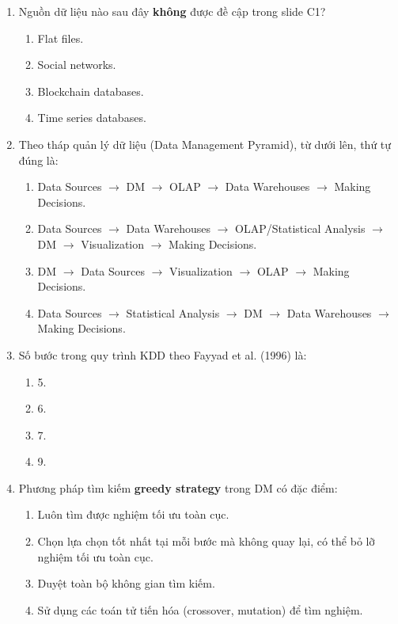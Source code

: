 \documentclass[10pt]{article}
\begin{document}
\begin{enumerate}[leftmargin=*, label=\textbf{Câu \arabic*.}]
    \item Nguồn dữ liệu nào sau đây \textbf{không} được đề cập trong slide C1?
    \begin{enumerate}[label=\Alph*.]
        \item Flat files.
        \item Social networks.
        \item Blockchain databases.
        \item Time series databases.
    \end{enumerate}

    \item Theo tháp quản lý dữ liệu (Data Management Pyramid), từ dưới lên, thứ tự đúng là:
    \begin{enumerate}[label=\Alph*.]
        \item Data Sources $\to$ DM $\to$ OLAP $\to$ Data Warehouses $\to$ Making Decisions.
        \item Data Sources $\to$ Data Warehouses $\to$ OLAP/Statistical Analysis $\to$ DM $\to$ Visualization $\to$ Making Decisions.
        \item DM $\to$ Data Sources $\to$ Visualization $\to$ OLAP $\to$ Making Decisions.
        \item Data Sources $\to$ Statistical Analysis $\to$ DM $\to$ Data Warehouses $\to$ Making Decisions.
    \end{enumerate}

    \item Số bước trong quy trình KDD theo Fayyad et al. (1996) là:
    \begin{enumerate}[label=\Alph*.]
        \item 5.
        \item 6.
        \item 7.
        \item 9.
    \end{enumerate}

    \item Phương pháp tìm kiếm \textbf{greedy strategy} trong DM có đặc điểm:
    \begin{enumerate}[label=\Alph*.]
        \item Luôn tìm được nghiệm tối ưu toàn cục.
        \item Chọn lựa chọn tốt nhất tại mỗi bước mà không quay lại, có thể bỏ lỡ nghiệm tối ưu toàn cục.
        \item Duyệt toàn bộ không gian tìm kiếm.
        \item Sử dụng các toán tử tiến hóa (crossover, mutation) để tìm nghiệm.
    \end{enumerate}


\end{enumerate}
\end{document}
